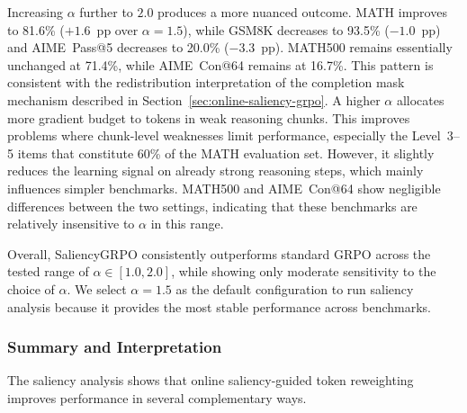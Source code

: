 \documentclass[12pt]{report}
\begin{document}
Increasing $\alpha$ further to $2.0$ produces a more nuanced outcome.
MATH improves to 81.6\% ($+1.6$~pp over $\alpha = 1.5$), while GSM8K
decreases to 93.5\% ($-1.0$~pp) and AIME~Pass@5 decreases to 20.0\%
($-3.3$~pp).  MATH500 remains essentially unchanged at 71.4\%, while AIME~Con@64
remains at 16.7\%.
This pattern is consistent with the redistribution interpretation of the
completion mask mechanism described in
Section~\ref{sec:online-saliency-grpo}. A higher $\alpha$ allocates more gradient budget to tokens in weak reasoning chunks. 
This improves problems where chunk-level weaknesses limit performance, especially the Level~3--5 items that constitute 60\% of the MATH evaluation set. 
However, it slightly reduces the learning signal on already strong reasoning steps, which mainly influences simpler benchmarks.
MATH500 and AIME~Con@64 show negligible differences between the two
settings, indicating that these benchmarks are relatively insensitive
to $\alpha$ in this range.

Overall, SaliencyGRPO consistently outperforms standard GRPO across the
tested range of $\alpha \in [1.0, 2.0]$, while showing only moderate
sensitivity to the choice of $\alpha$. We select $\alpha = 1.5$ as the
default configuration to run saliency analysis because it provides the most stable performance across benchmarks.

\subsubsection{Summary and Interpretation}

The saliency analysis shows that online saliency-guided token reweighting improves performance in several complementary ways.
\end{document}
